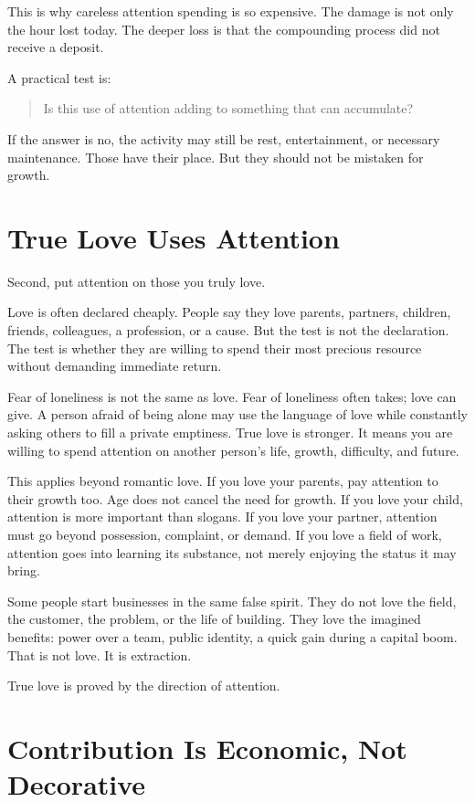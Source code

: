 This is why careless attention spending is so expensive. The damage is not only the hour lost today. The deeper loss is that the compounding process did not receive a deposit.

A practical test is:

\begin{quote}
Is this use of attention adding to something that can accumulate?
\end{quote}

If the answer is no, the activity may still be rest, entertainment, or necessary maintenance. Those have their place. But they should not be mistaken for growth.

\section*{True Love Uses Attention}

Second, put attention on those you truly love.

Love is often declared cheaply. People say they love parents, partners, children, friends, colleagues, a profession, or a cause. But the test is not the declaration. The test is whether they are willing to spend their most precious resource without demanding immediate return.

Fear of loneliness is not the same as love. Fear of loneliness often takes; love can give. A person afraid of being alone may use the language of love while constantly asking others to fill a private emptiness. True love is stronger. It means you are willing to spend attention on another person's life, growth, difficulty, and future.

This applies beyond romantic love. If you love your parents, pay attention to their growth too. Age does not cancel the need for growth. If you love your child, attention is more important than slogans. If you love your partner, attention must go beyond possession, complaint, or demand. If you love a field of work, attention goes into learning its substance, not merely enjoying the status it may bring.

Some people start businesses in the same false spirit. They do not love the field, the customer, the problem, or the life of building. They love the imagined benefits: power over a team, public identity, a quick gain during a capital boom. That is not love. It is extraction.

True love is proved by the direction of attention.

\section*{Contribution Is Economic, Not Decorative}

